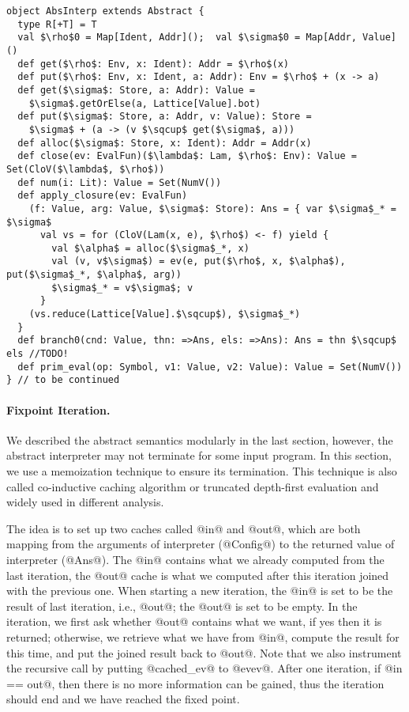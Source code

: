 \begin{lstlisting}
object AbsInterp extends Abstract {
  type R[+T] = T
  val $\rho$0 = Map[Ident, Addr]();  val $\sigma$0 = Map[Addr, Value]()
  def get($\rho$: Env, x: Ident): Addr = $\rho$(x)
  def put($\rho$: Env, x: Ident, a: Addr): Env = $\rho$ + (x -> a)
  def get($\sigma$: Store, a: Addr): Value = 
    $\sigma$.getOrElse(a, Lattice[Value].bot)
  def put($\sigma$: Store, a: Addr, v: Value): Store =
    $\sigma$ + (a -> (v $\sqcup$ get($\sigma$, a)))
  def alloc($\sigma$: Store, x: Ident): Addr = Addr(x)
  def close(ev: EvalFun)($\lambda$: Lam, $\rho$: Env): Value = Set(CloV($\lambda$, $\rho$))
  def num(i: Lit): Value = Set(NumV())
  def apply_closure(ev: EvalFun)
    (f: Value, arg: Value, $\sigma$: Store): Ans = { var $\sigma$_* = $\sigma$
      val vs = for (CloV(Lam(x, e), $\rho$) <- f) yield {
        val $\alpha$ = alloc($\sigma$_*, x)
        val (v, v$\sigma$) = ev(e, put($\rho$, x, $\alpha$), put($\sigma$_*, $\alpha$, arg))
        $\sigma$_* = v$\sigma$; v
      }
    (vs.reduce(Lattice[Value].$\sqcup$), $\sigma$_*)
  }
  def branch0(cnd: Value, thn: =>Ans, els: =>Ans): Ans = thn $\sqcup$ els //TODO!
  def prim_eval(op: Symbol, v1: Value, v2: Value): Value = Set(NumV())
} // to be continued
\end{lstlisting}

\paragraph{Fixpoint Iteration.}
We described the abstract semantics modularly in the last section, however, the abstract 
interpreter may not terminate for some input program. In this section, we use a memoization
technique to ensure its termination. This technique is also called co-inductive caching algorithm
\cite{DBLP:journals/pacmpl/DaraisLNH17, Wei:2018:RAA:3243631.3236800} or truncated depth-first evaluation 
\cite{Rosendahl:AbsIntPL} and widely used in different analysis.

The idea is to set up two caches called @in@ and @out@, which are both mapping from the arguments of interpreter 
(@Config@) to the returned value of interpreter (@Ans@). The @in@ contains what we already computed from the last
iteration, the @out@ cache is what we computed after this iteration joined with the previous one.
When starting a new iteration, the @in@ is set to be the result of last iteration, i.e., @out@; the @out@ is set
to be empty. In the iteration, we first ask whether @out@ contains what we want, if yes then it is returned;
otherwise, we retrieve what we have from @in@, compute the result for this time, and put the joined result back to @out@.
Note that we also instrument the recursive call by putting @cached_ev@ to @evev@.
After one iteration, if @in == out@, then there is no more information can be gained, thus the iteration should 
end and we have reached the fixed point.

